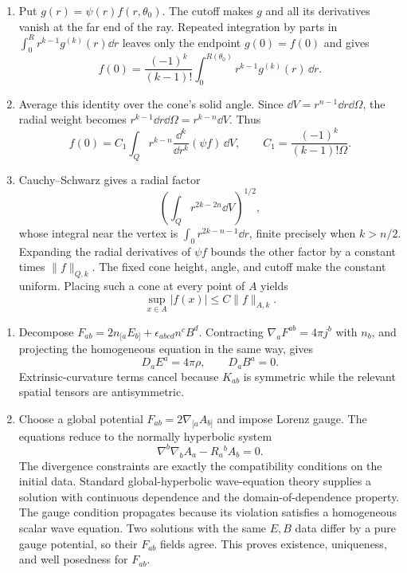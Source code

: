 \ExerciseEditorialNote

\begin{enumerate}[leftmargin=2.8em,itemsep=1.2em]
\begin{enumerate}[label=\alph*),leftmargin=2em]
\item Put \(g(r)=\psi(r)f(r,\theta_0)\).  The cutoff makes \(g\) and all its
derivatives vanish at the far end of the ray.  Repeated integration by parts
in
\(\int_0^R r^{k-1}g^{(k)}(r)\dd r\) leaves only the endpoint \(g(0)=f(0)\)
and gives
\[
 f(0)=\frac{(-1)^k}{(k-1)!}
 \int_0^{R(\theta_0)}r^{k-1}g^{(k)}(r)\,\dd r.
\]

\item Average this identity over the cone's solid angle.  Since
\(\dd V=r^{n-1}\dd r\dd\Omega\), the radial weight becomes
\(r^{k-1}\dd r\dd\Omega=r^{k-n}\dd V\).  Thus
\[
 f(0)=C_1\int_Qr^{k-n}\frac{\dd^k}{\dd r^k}(\psi f)\,\dd V,
 \qquad C_1=\frac{(-1)^k}{(k-1)!\Omega}.
\]

\item Cauchy--Schwarz gives a radial factor
\[
 \left(\int_Qr^{2k-2n}\dd V\right)^{1/2},
\]
whose integral near the vertex is
\(\int_0 r^{2k-n-1}\dd r\), finite precisely when \(k>n/2\).  Expanding
the radial derivatives of \(\psi f\) bounds the other factor by a constant
times \(\|f\|_{Q,k}\).  The fixed cone height, angle, and cutoff make the
constant uniform.  Placing such a cone at every point of \(A\) yields
\[
 \sup_{x\in A}|f(x)|\le C\|f\|_{A,k}.
\]
\end{enumerate}

\begin{enumerate}[label=\alph*),leftmargin=2em]
\item Decompose
\(F_{ab}=2n_{[a}E_{b]}+\epsilon_{abcd}n^cB^d\).  Contracting
\(\nabla_aF^{ab}=4\pi j^b\) with \(n_b\), and projecting the homogeneous
equation in the same way, gives
\[
 D_aE^a=4\pi\rho,
 \qquad D_aB^a=0.
\]
Extrinsic-curvature terms cancel because \(K_{ab}\) is symmetric while the
relevant spatial tensors are antisymmetric.

\item Choose a global potential \(F_{ab}=2\nabla_{[a}A_{b]}\) and impose
Lorenz gauge.  The equations reduce to the normally hyperbolic system
\[
 \nabla^b\nabla_bA_a-R_a{}^bA_b=0.
\]
The divergence constraints are exactly the compatibility conditions on the
initial data.  Standard global-hyperbolic wave-equation theory supplies a
solution with continuous dependence and the domain-of-dependence property.
The gauge condition propagates because its violation satisfies a homogeneous
scalar wave equation.  Two solutions with the same \(E,B\) data differ by a
pure gauge potential, so their \(F_{ab}\) fields agree.  This proves existence,
uniqueness, and well posedness for \(F_{ab}\).
\end{enumerate}


\end{enumerate}
